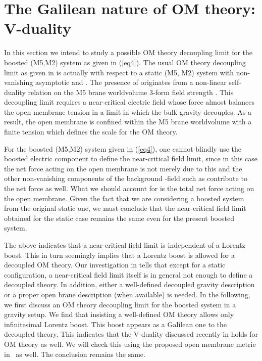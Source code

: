 \documentclass[a4paper,12pt]{article}
\providecommand{\sect}[1]{\setcounter{equation}{0}\section{#1}}
\begin{document}
 
\sect{The Galilean nature of OM theory: V-duality}

In this section we intend to study a possible OM theory decoupling limit
 for the boosted (M5,M2) system  as given in (\ref{eq4}). 
The usual OM theory decoupling limit as given in \cite{Gop2,Berg2} 
is actually with respect to a static (M5, M2) system with non-vanishing
asymptotic \coordHE{} and \coordHE{}. The presence of \coordHE{} originates
 from a non-linear self-duality relation on the M5 brane worldvolume 
3-form field strength \cite{Perry,Howe}. This decoupling limit requires 
a near-critical
 electric field \coordHE{} whose force almost balances the open membrane
 tension in a limit in which the bulk gravity decouples. As a result,
 the open membrane is confined within the M5 brane worldvolume with a
 finite tension which defines the scale for the OM theory.

 For the boosted (M5,M2) system given
in (\ref{eq4}), one cannot blindly use the boosted electric component 
\coordHE{} to define the near-critical field limit, since in this case the
net force acting on the open membrane is not merely due to this \coordHE{}
and the other non-vanishing components of the background \coordHE{}-field 
such as \coordHE{} contribute to the net force as well. What we should
account for is the total net force acting on the open membrane. Given
the fact that we are considering a boosted system from the original
static one, we must conclude that the near-critical field limit obtained
for the static case remains the same even for the present boosted
system.
 
	The above indicates that a near-critical field limit is 
independent of a Lorentz boost. This in turn seemingly implies that a
Lorentz boost is allowed for a decoupled OM theory. Our investigation
in \cite{clwone} tells that except for a static configuration, a
near-critical field limit itself is in general not enough to define a 
decoupled theory. In addition, either a well-defined decoupled gravity 
description or a proper open brane description (when available) is needed.
In the following, we first discuss an OM theory decoupling limit for the
boosted system in a gravity setup. We find that insisting a well-defined
OM theory allows only infinitesimal Lorentz boost. This boost appears as 
a Galilean one to the decoupled theory. This indicates that the 
V-duality discussed recently in \cite{CW,CLW} holds for OM theory as
well. We will check this using the proposed open membrane metric 
in~\cite{Berg,Berg2} as well. The conclusion remains the same. 
	
\end{document}
